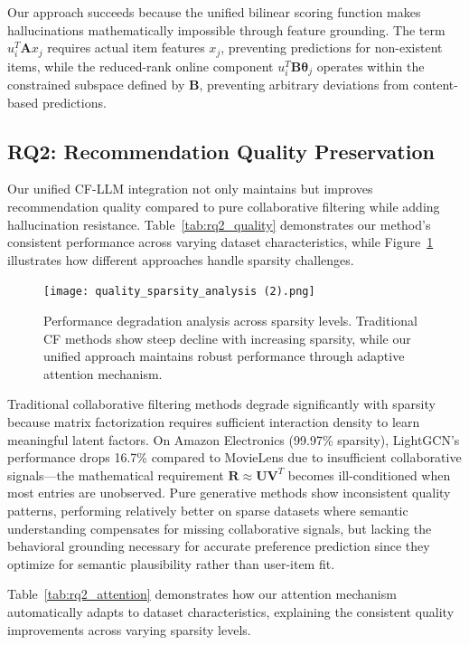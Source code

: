 \documentclass[acmsmall]{acmart}
\begin{document}
Our approach succeeds because the unified bilinear scoring function makes hallucinations mathematically impossible through feature grounding. The term $u_i^T \mathbf{A} x_j$ requires actual item features $x_j$, preventing predictions for non-existent items, while the reduced-rank online component $u_i^T \mathbf{B} \boldsymbol{\theta}_j$ operates within the constrained subspace defined by $\mathbf{B}$, preventing arbitrary deviations from content-based predictions.

\subsection{RQ2: Recommendation Quality Preservation}

Our unified CF-LLM integration not only maintains but improves recommendation quality compared to pure collaborative filtering while adding hallucination resistance. Table~\ref{tab:rq2_quality} demonstrates our method's consistent performance across varying dataset characteristics, while Figure~\ref{fig:rq2_sparsity} illustrates how different approaches handle sparsity challenges.
\begin{figure}[h]
\centering
\texttt{[image: quality\_sparsity\_analysis (2).png]}
\caption{Performance degradation analysis across sparsity levels. Traditional CF methods show steep decline with increasing sparsity, while our unified approach maintains robust performance through adaptive attention mechanism.}
\label{fig:rq2_sparsity}
\end{figure}
Traditional collaborative filtering methods degrade significantly with sparsity because matrix factorization requires sufficient interaction density to learn meaningful latent factors. On Amazon Electronics (99.97\% sparsity), LightGCN's performance drops 16.7\% compared to MovieLens due to insufficient collaborative signals—the mathematical requirement $\mathbf{R} \approx \mathbf{U}\mathbf{V}^T$ becomes ill-conditioned when most entries are unobserved. Pure generative methods show inconsistent quality patterns, performing relatively better on sparse datasets where semantic understanding compensates for missing collaborative signals, but lacking the behavioral grounding necessary for accurate preference prediction since they optimize for semantic plausibility rather than user-item fit.

Table~\ref{tab:rq2_attention} demonstrates how our attention mechanism automatically adapts to dataset characteristics, explaining the consistent quality improvements across varying sparsity levels.
\end{document}
